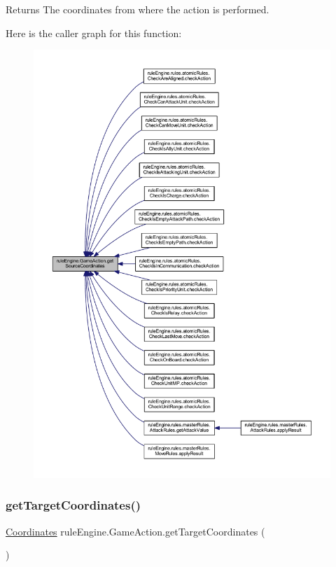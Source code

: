 \begin{DoxyReturn}{Returns}
The coordinates from where the action is performed. 
\end{DoxyReturn}
Here is the caller graph for this function\+:
\nopagebreak
\begin{figure}[H]
\begin{center}
\leavevmode
\includegraphics[width=350pt]{classrule_engine_1_1_game_action_a27182b152911857a0f87e4977e2246f1_icgraph}
\end{center}
\end{figure}
\mbox{\label{classrule_engine_1_1_game_action_ade50aef53ec161c2f0976f38d1ed006c}} 
\subsubsection{\texorpdfstring{get\+Target\+Coordinates()}{getTargetCoordinates()}}
{\footnotesize\ttfamily \mbox{\hyperlink{classrule_engine_1_1_coordinates}{Coordinates}} rule\+Engine.\+Game\+Action.\+get\+Target\+Coordinates (\begin{DoxyParamCaption}{ }\end{DoxyParamCaption})\hspace{0.3cm}{\ttfamily [inline]}}

